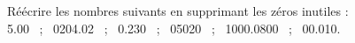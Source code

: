 \begin{exercice}
    Réécrire les nombres suivants en supprimant les zéros inutiles : \\
    \num{5.00} \, ; \, \num{0204.02} \, ; \, \num{0.230} \, ; \, \num{05 020} \, ; \, \num{1000.0800} \, ; \, \num{00.010}.
 \end{exercice}